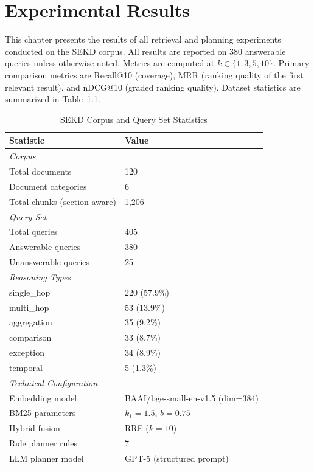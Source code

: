 \chapter{Experimental Results}
\label{chap:results}

This chapter presents the results of all retrieval and planning experiments conducted on the SEKD corpus. All results are reported on 380 answerable queries unless otherwise noted. Metrics are computed at $k \in \{1, 3, 5, 10\}$. Primary comparison metrics are Recall@10 (coverage), MRR (ranking quality of the first relevant result), and nDCG@10 (graded ranking quality). Dataset statistics are summarized in Table~\ref{tab:dataset}.

\begin{table}[htbp]
\centering
\caption{SEKD Corpus and Query Set Statistics}
\label{tab:dataset}
\begin{tabular}{ll}
\toprule
\textbf{Statistic} & \textbf{Value} \\
\midrule
\multicolumn{2}{l}{\textit{Corpus}} \\
\quad Total documents & 120 \\
\quad Document categories & 6 \\
\quad Total chunks (section-aware) & 1{,}206 \\
\midrule
\multicolumn{2}{l}{\textit{Query Set}} \\
\quad Total queries & 405 \\
\quad Answerable queries & 380 \\
\quad Unanswerable queries & 25 \\
\midrule
\multicolumn{2}{l}{\textit{Reasoning Types}} \\
\quad single\_hop & 220 (57.9\%) \\
\quad multi\_hop & 53 (13.9\%) \\
\quad aggregation & 35 (9.2\%) \\
\quad comparison & 33 (8.7\%) \\
\quad exception & 34 (8.9\%) \\
\quad temporal & 5 (1.3\%) \\
\midrule
\multicolumn{2}{l}{\textit{Technical Configuration}} \\
\quad Embedding model & BAAI/bge-small-en-v1.5 (dim=384) \\
\quad BM25 parameters & $k_1{=}1.5$, $b{=}0.75$ \\
\quad Hybrid fusion & RRF ($k{=}10$) \\
\quad Rule planner rules & 7 \\
\quad LLM planner model & GPT-5 (structured prompt) \\
\bottomrule
\end{tabular}
\end{table}

